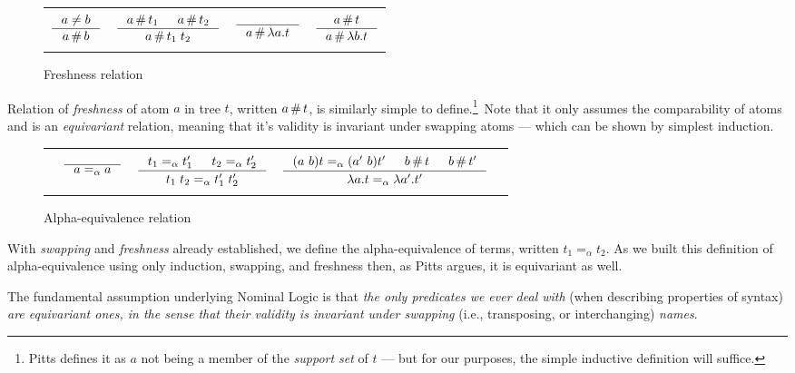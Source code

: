 \documentclass[english, mgr]{iithesis}
\renewcommand{\it}[1]{\textit{#1}}
\newcommand{\aequiv}{\ensuremath{=_\alpha}}
\begin{document}
\begin{figure}[htbp]
  \centering
    \begin{tabularx}{\textwidth}{|CCCC|}
      \hline & & & \\
      $
      \inference{
        a \cneq b
      }{
        a \cfresh b
      }
      $ & $
      \inference{
        a \cfresh t_1 & a \cfresh t_2
      }{
        a \cfresh t_1\;t_2
      }
      $ & $
      \inference{
      }{
        a \cfresh \lambda a . t
      }
      $ & $
      \inference{
        a \cfresh t
      }{
        a \cfresh \lambda b . t
      }
      $ \\ & & & \\ \hline
    \end{tabularx}
  \caption{Freshness relation}
  \label{fig:fresh}
\end{figure}
Relation of \it{freshness} of atom $a$ in tree $t$, written $a \,\#\, t$,
is similarly simple to define.\footnote{Pitts defines it as
$a$ not being a member of the \it{support set} of $t$ ---
but for our purposes, the simple inductive definition will suffice.}\
Note that it only assumes the comparability of atoms
and is an \it{equivariant} relation, meaning that
it's validity is invariant under swapping atoms
--- which can be shown by simplest induction.

\begin{figure}[htbp]
  \centering
    \begin{tabularx}{\textwidth}{|ccCcc|}
    \hline & & & & \\ {} &
    $
    \inference{
      \text{}
    }{
      a \aequiv a
    }
    $ & $
    \inference{
      t_1 \aequiv t_1' & t_2 \aequiv t_2'
    }{
      t_1\;t_2 \aequiv t_1'\;t_2'
    }
    $ & $
    \inference{
      \permswap{a}{b}{t} \aequiv \permswap{a'}{b}{t'} & b \cfresh t & b \cfresh t'
    }{
      \lambda a . t \aequiv \lambda a' . t'
    }
    $ & {} \\ & & & & \\ \hline
    \end{tabularx}
  \caption{Alpha-equivalence relation}
  \label{fig:fresh}
\end{figure}
With \it{swapping} and \it{freshness} already established,
we define the alpha-equivalence of terms, written $t_1 \aequiv t_2$.
As we built this definition of alpha-equivalence using only induction,
swapping, and freshness then, as Pitts argues, it is equivariant as well.
\begin{mdframed}[frametitle={Pitts, 2003}]
The fundamental assumption underlying Nominal Logic is that \textit{the only predicates we ever deal with} (when describing properties of syntax) \textit{are equivariant ones, in the sense that their validity is invariant under swapping} (i.e., transposing, or interchanging) \textit{names}.
\end{mdframed}
\end{document}
